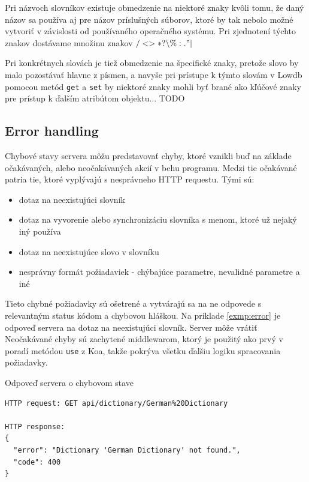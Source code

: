 \documentclass[
  digital, %
  table,   %
  lof,     %
  lot,     %
]{fithesis3}
\begin{document}
Pri názvoch slovníkov existuje obmedzenie na niektoré znaky kvôli tomu, že daný názov sa používa aj pre názov príslušných súborov, ktoré by tak nebolo možné vytvoriť v závislosti od používaného operačného systému. Pri zjednotení týchto znakov dostávame množinu znakov $\slash < > * ? \backslash \% : . "  \vert$

Pri konkrétnych slovách je tiež obmedzenie na špecifické znaky, pretože slovo by malo pozostávať hlavne z písmen, a navyše pri prístupe k týmto slovám v Lowdb pomocou metód \texttt{get} a \texttt{set} by niektoré znaky mohli byť brané ako kľúčové znaky pre prístup k ďalším atribútom objektu... TODO

\subsection{Error handling}
Chybové stavy servera môžu predstavovať chyby, ktoré vznikli buď na základe očakávaných, alebo neočakávaných akcií v behu programu. Medzi tie očakávané patria tie, ktoré vyplývajú s nesprávneho HTTP requestu. Tými sú:
\begin{itemize}
\item dotaz na neexistujúci slovník
\item dotaz na vyvorenie alebo synchronizáciu slovníka s menom, ktoré už nejaký iný používa
\item dotaz na neexistujúce slovo v slovníku
\item nesprávny formát požiadaviek - chýbajúce parametre, nevalidné parametre a iné
\end{itemize}

Tieto chybné požiadavky sú ošetrené a vytvárajú sa na ne odpovede s relevantným status kódom a chybovou hláškou. Na príklade \ref{exmp:error} je odpoveď servera na dotaz na neexistujúci slovník. Server môže vrátiť Neočakávané chyby sú zachytené middlewarom, ktorý je použitý ako prvý v poradí metódou \texttt{use} z Koa, takže pokrýva všetku ďalšiu logiku spracovania požiadavky.

\begin{exmp}
\label{exmp:error}
Odpoveď servera o chybovom stave
\centering
\begin{lstlisting}[basicstyle=\small]
HTTP request: GET api/dictionary/German%20Dictionary

HTTP response:
{
  "error": "Dictionary 'German Dictionary' not found.",
  "code": 400
}
\end{lstlisting}
\end{exmp}
\end{document}
